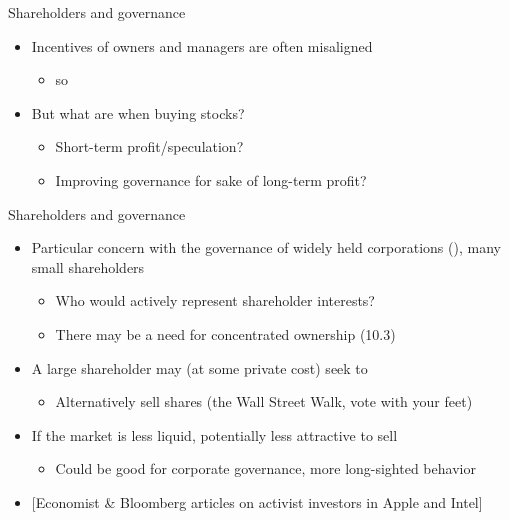 \documentclass[english,10pt
,aspectratio=169
]{beamer}
\begin{document}
\begin{frame}{Shareholders and governance}
	\begin{itemize}
		\item Incentives of owners and managers are often misaligned
		\begin{itemize}
			\item so 
		\end{itemize}
		\item But what are  when buying stocks?
		\begin{itemize}
			\item Short-term profit/speculation?
			\item Improving governance for sake of long-term profit?
		\end{itemize}
	\end{itemize}
\end{frame}


\begin{frame}{Shareholders and governance}
	\begin{itemize}
		\item Particular concern with the governance of widely held corporations (\cite{berle_modern_1932}), many small shareholders
		\begin{itemize}
			\item Who would actively represent shareholder interests?
			\item There may be a need for concentrated ownership (10.3)
		\end{itemize}
		\item A large shareholder may (at some private cost) seek to 
		\begin{itemize}
			\item Alternatively sell shares (the Wall Street Walk, vote with your feet)
		\end{itemize}
		\item If the market is less liquid, potentially less attractive to sell
		\begin{itemize}
			\item Could be good for corporate governance, more long-sighted behavior
		\end{itemize}
		\item $[$Economist \& Bloomberg articles on activist investors in Apple and Intel]
	\end{itemize}
\end{frame}
\end{document}
